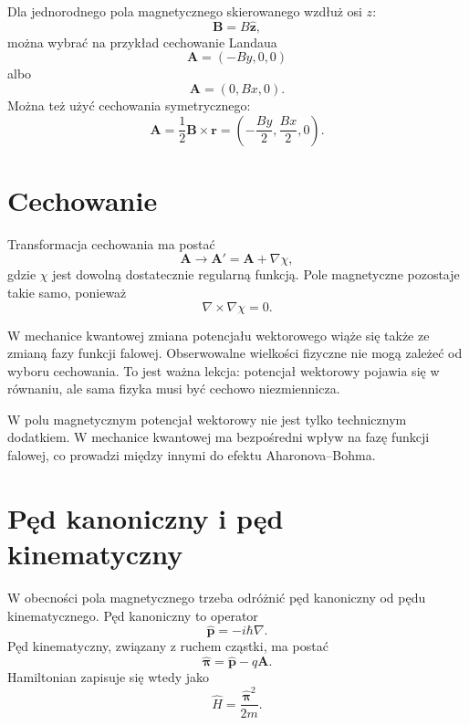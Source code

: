 Dla jednorodnego pola magnetycznego skierowanego wzdłuż osi \(z\):
\begin{equation}
    \mathbf{B}=B\hat{\mathbf{z}},
\end{equation}
można wybrać na przykład cechowanie Landaua
\begin{equation}
    \mathbf{A}=(-By,0,0)
\end{equation}
albo
\begin{equation}
    \mathbf{A}=(0,Bx,0).
\end{equation}
Można też użyć cechowania symetrycznego:
\begin{equation}
    \mathbf{A}=\frac{1}{2}\mathbf{B}\times\mathbf{r}
    =\left(-\frac{By}{2},\frac{Bx}{2},0\right).
\end{equation}

\section{Cechowanie}

Transformacja cechowania ma postać
\begin{equation}
    \mathbf{A}\longrightarrow \mathbf{A}'=\mathbf{A}+\nabla\chi,
\end{equation}
gdzie \(\chi\) jest dowolną dostatecznie regularną funkcją. Pole magnetyczne pozostaje takie samo, ponieważ
\begin{equation}
    \nabla\times\nabla\chi=0.
\end{equation}

W mechanice kwantowej zmiana potencjału wektorowego wiąże się także ze zmianą fazy funkcji falowej. Obserwowalne wielkości fizyczne nie mogą zależeć od wyboru cechowania. To jest ważna lekcja: potencjał wektorowy pojawia się w równaniu, ale sama fizyka musi być cechowo niezmiennicza.

\begin{remarkbox}
W polu magnetycznym potencjał wektorowy nie jest tylko technicznym dodatkiem. W mechanice kwantowej ma bezpośredni wpływ na fazę funkcji falowej, co prowadzi między innymi do efektu Aharonova--Bohma.
\end{remarkbox}

\section{Pęd kanoniczny i pęd kinematyczny}

W obecności pola magnetycznego trzeba odróżnić pęd kanoniczny od pędu kinematycznego. Pęd kanoniczny to operator
\begin{equation}
    \hat{\mathbf{p}}=-i\hbar\nabla.
\end{equation}
Pęd kinematyczny, związany z ruchem cząstki, ma postać
\begin{equation}
    \hat{\boldsymbol{\pi}}=\hat{\mathbf{p}}-q\mathbf{A}.
\end{equation}
Hamiltonian zapisuje się wtedy jako
\begin{equation}
    \hat{H}=\frac{\hat{\boldsymbol{\pi}}^2}{2m}.
\end{equation}

